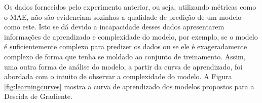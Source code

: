 \documentclass[conference]{IEEEtran}
\begin{document}
Os dados fornecidos pelo experimento anterior, ou seja, utilizando métricas como o MAE, não são evidenciam sozinhos a qualidade de predição de um modelo como este. Isto se dá devido a incapacidade desses dados apresentarem informações de aprendizado e complexidade do modelo, por exemplo, se o modelo é suficientemente complexo para predizer os dados ou se ele é exageradamente complexo de forma que tenha se moldado ao conjunto de treinamento. Assim, uma outra forma de análise do modelo, a partir da curva de aprendizado, foi abordada com o intuito de observar a complexidade do modelo. A Figura \ref{fig:learningcurves} mostra a curva de aprendizado dos modelos propostos para a Descida de Gradiente.

\begin{figure}[!h]
	\centering
	\quad
\end{figure}
\end{document}

